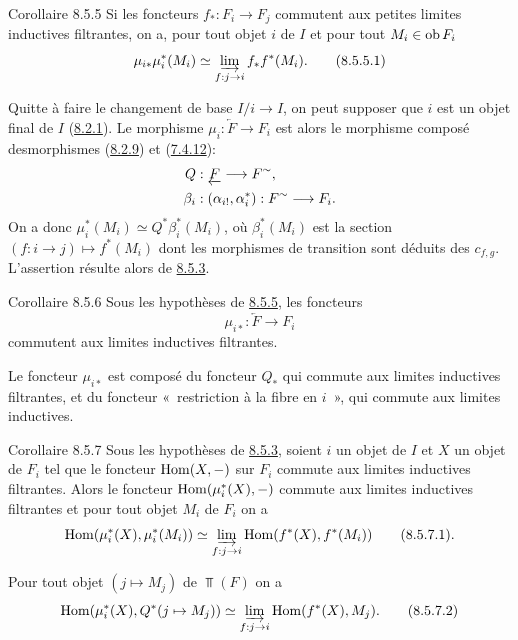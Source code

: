 \documentclass[10pt]{../fichiers-configuration-latex/smfart}
\begin{document}
\begin{enonce*}{Corollaire 8.5.5}
Si les foncteurs $f_{\ast} : F_{i} \to F_{j}$ commutent aux petites
limites inductives filtrantes, on a, pour tout objet $i$ de $I$ et
pour tout $M_i \in \operatorname{ob} F_i$
\begin{equation*}
\mu_{i\ast} \mu_{i}^{\ast} (M_i) \simeq \varinjlim_{f : j \to
      i} f_{\ast} f^{\ast}(M_i){\quoi}.\tag{8.5.5.1}
\end{equation*}
\end{enonce*}
\noindent
Quitte à faire le changement de base $I/i \to I$, on peut supposer que
$i$ est un objet final de $I$ (\hyperref[VI.lem8.2.1]{8.2.1}). Le morphisme $\mu_{i} :
\underleftarrow{F} \to F_i$ est alors le morphisme composé
des\pageoriginale morphismes (\hyperref[VI.thm8.2.9]{8.2.9}) et (\hyperref[VI.lem7.4.12]{7.4.12}):
\begin{align*}
Q &: \underleftarrow{F} \to F^{\sim}{\quoi},\\
\beta_i &: (\alpha_{i!}, \alpha^{\ast}_i) : F^{\sim} \to F_i{\quoi}.
\end{align*}
On a donc $\mu_i^{\ast} (M_i) \simeq Q^{\ast} \beta_i^{\ast} (M_i)$,
où $\beta_i^{\ast} (M_i)$ est la section $(f : i \to j) \mapsto
f^{\ast}(M_i)$ dont les morphismes de transition sont déduits des
$c_{f,g}$. L'assertion résulte alors de \hyperref[VI.prop8.5.3]{8.5.3}.

\begin{enonce*}{Corollaire 8.5.6}
Sous les hypothèses de \hyperref[VI.cor8.5.5]{8.5.5}, les foncteurs
$$
\mu_{i\ast} : \underleftarrow{F} \to F_i
$$
commutent aux limites inductives filtrantes.
\end{enonce*}

Le foncteur $\mu_{i\ast}$ est composé du foncteur $Q_{\ast}$ qui
commute aux limites inductives filtrantes, et du foncteur « restriction à la fibre en $i$ », qui commute aux limites inductives.

\begin{enonce*}{Corollaire 8.5.7}
Sous les hypothèses de \hyperref[VI.prop8.5.3]{8.5.3}, soient $i$ un objet de $I$ et $X$ un
objet de $F_i$ tel que le foncteur $\operatorname{Hom}(X, -)$ sur $F_i$ commute aux
limites inductives filtrantes. Alors le foncteur $\operatorname{Hom}(\mu^{\ast}_i
(X), -)$ commute aux limites inductives filtrantes et pour tout objet
$M_i$ de $F_i$ on a
\begin{equation*}
\Hom(\mu^{\ast}_i(X), \mu^{\ast}_i(M_i)) \simeq \varinjlim_{f
: j \to i} \Hom(f^{\ast}(X), f^{\ast}(M_i))\tag{8.5.7.1}{\quoi}.
\end{equation*}
\end{enonce*}
\noindent
Pour tout objet $(j \mapsto M_j)$ de $\Top(F)$ on a
\begin{equation*}
\Hom(\mu^{\ast}_i(X), Q^{\ast}(j \mapsto M_j)) \simeq \varinjlim_{f
: j \to i} \Hom(f^{\ast}(X), M_{j}){\quoi}.\tag{8.5.7.2}
\end{equation*}
\end{document}
